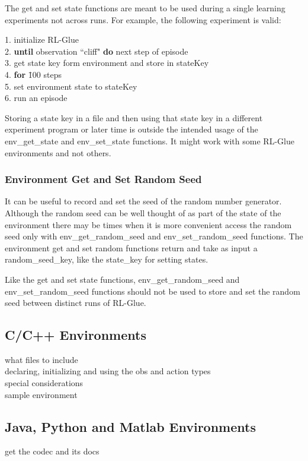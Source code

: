 \documentclass[11pt]{article}
\begin{document}
The get and set state functions are meant to be used during a single learning experiments not across runs. For example, the following experiment is valid:
\begin{tabbing}
1. initialize RL-Glue\\
2. {\bf until} observation ``cliff" {\bf do} next step of episode\\
3. get state key form environment and store in stateKey\\
4. {\bf for} \=100 steps\\
5. \> set environment state to stateKey\\
6. \> run an episode
\end{tabbing}
Storing a state key in a file and then using that state key in a different experiment program or later time is outside the intended usage of the env\_get\_state and env\_set\_state functions. It might work with some RL-Glue environments and not others.
        
\subsubsection{Environment Get and Set Random Seed}
It can be useful to record and set the seed of the random number generator. Although the random seed can be well thought of as part of the state of the environment there may be times when it is more convenient access the random seed only with env\_get\_random\_seed and env\_set\_random\_seed functions. The environment get and set random functions return and take as input a random\_seed\_key, like the state\_key for setting states. 

Like the get and set state functions, env\_get\_random\_seed and env\_set\_random\_seed functions should not be used to store and set the random seed between distinct runs of RL-Glue.

\subsection{C/C++ Environments}
\label{envp3}

what files to include\\
declaring, initializing and using the obs and action types\\
special considerations\\
sample environment\\


\subsection{Java, Python and Matlab Environments}
get the codec and its docs
\end{document}
